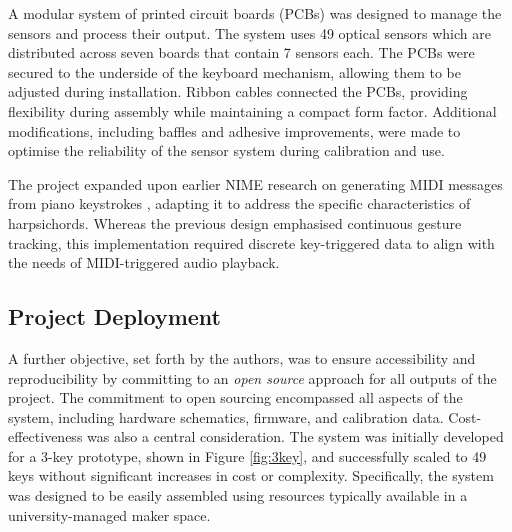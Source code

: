 

A modular system of printed circuit boards (PCBs) was designed to manage the sensors and process their output. The system uses 49 optical sensors which are distributed across seven boards that contain 7 sensors each. The PCBs were secured to the underside of the keyboard mechanism, allowing them to be adjusted during installation. Ribbon cables connected the PCBs, providing flexibility during assembly while maintaining a compact form factor. Additional modifications, including baffles and adhesive improvements, were made to optimise the reliability of the sensor system during calibration and use.

The project expanded upon earlier NIME research on generating MIDI messages from piano keystrokes \cite{McPherson2013}, adapting it to address the specific characteristics of harpsichords. Whereas the previous design emphasised continuous gesture tracking, this implementation required discrete key-triggered data to align with the needs of MIDI-triggered audio playback. 

\subsection{Project Deployment}
A further objective, set forth by the authors, was to ensure accessibility and reproducibility by committing to an \emph{open source} approach for all outputs of the project. The commitment to open sourcing encompassed all aspects of the system, including hardware schematics, firmware, and calibration data. Cost-effectiveness was also a central consideration. The system was initially developed for a 3-key prototype, shown in Figure \ref{fig:3key}, and successfully scaled to 49 keys without significant increases in cost or complexity. Specifically, the system was designed to be easily assembled using resources typically available in a university-managed maker space.

